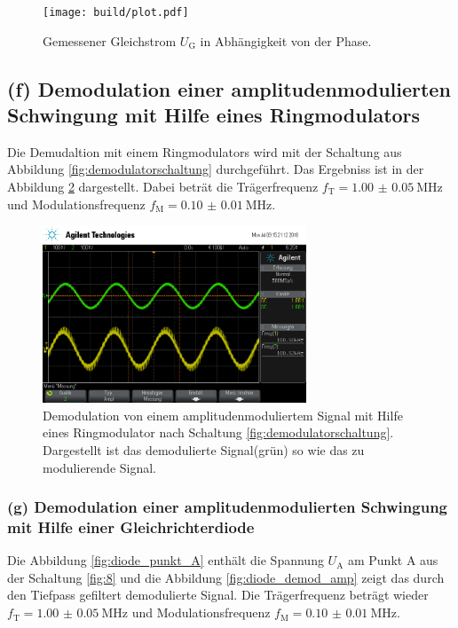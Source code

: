 \begin{figure}
  \centering
  \texttt{[image: build/plot.pdf]}
  \caption{Gemessener Gleichstrom $U_{\text{G}}$ in Abhängigkeit von der Phase.}
  \label{fig:plot}
\end{figure}


\FloatBarrier
\subsection{(f) Demodulation einer amplitudenmodulierten Schwingung
mit Hilfe eines Ringmodulators}
\label{subsubsec:auswertung_f}
Die Demudaltion mit einem Ringmodulators wird mit der Schaltung
aus Abbildung \ref{fig:demodulatorschaltung} durchgeführt. Das Ergebniss ist
in der Abbildung \ref{fig:amp_demod_ring} dargestellt.
Dabei beträt die Trägerfrequenz $f_{\text{T}}=\SI{1.00(5)}{\mega\hertz}$
und Modulationsfrequenz $f_{\text{M}}=\SI{0.10(1)}{\mega\hertz}$.


\begin{figure}
  \centering
  \includegraphics[width=0.7\textwidth]{osci/amp_demod.png}
  \caption{Demodulation von einem amplitudenmoduliertem Signal mit Hilfe eines
  Ringmodulator nach Schaltung \ref{fig:demodulatorschaltung}. Dargestellt ist das demodulierte Signal(grün) so wie das zu modulierende Signal.}
  \label{fig:amp_demod_ring}
\end{figure}




\FloatBarrier
\subsubsection{(g) Demodulation einer amplitudenmodulierten Schwingung
mit Hilfe einer Gleichrichterdiode}
\label{subsubsec:auswertung_g}
Die Abbildung \ref{fig:diode_punkt_A} enthält
die Spannung $U_{\text{A}}$ am Punkt A aus der
Schaltung \ref{fig:8} und die Abbildung \ref{fig:diode_demod_amp}
zeigt das durch den Tiefpass gefiltert demodulierte Signal.
Die Trägerfrequenz beträgt wieder $f_{\text{T}}=\SI{1.00(5)}{\mega\hertz}$
und Modulationsfrequenz $f_{\text{M}}=\SI{0.10(1)}{\mega\hertz}$.


